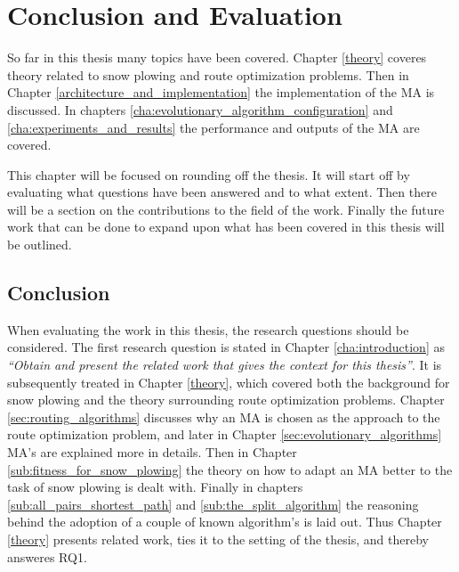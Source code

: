 \chapter{Conclusion and Evaluation}

So far in this thesis many topics have been covered. Chapter \ref{theory} coveres theory related to snow plowing and route optimization problems. Then in Chapter \ref{architecture_and_implementation} the implementation of the MA is discussed. In chapters \ref{cha:evolutionary_algorithm_configuration} and \ref{cha:experiments_and_results} the performance and outputs of the MA are covered.

This chapter will be focused on rounding off the thesis. It will start off by evaluating what questions have been answered and to what extent. Then there will be a section on the contributions to the field of the work. Finally the future work that can be done to expand upon what has been covered in this thesis will be outlined.

\section{Conclusion}

When evaluating the work in this thesis, the research questions should be considered. The first research question is stated in Chapter \ref{cha:introduction} as \emph{\enquote{Obtain and present the related work that gives the context for this thesis}}. It is subsequently treated in Chapter \ref{theory}, which covered both the background for snow plowing and the theory surrounding route optimization problems. Chapter \ref{sec:routing_algorithms} discusses why an MA is chosen as the approach to the route optimization problem, and later in Chapter \ref{sec:evolutionary_algorithms} MA's are explained more in details. Then in Chapter \ref{sub:fitness_for_snow_plowing} the theory on how to adapt an MA better to the task of snow plowing is dealt with. Finally in chapters \ref{sub:all_pairs_shortest_path} and \ref{sub:the_split_algorithm} the reasoning behind the adoption of a couple of known algorithm's is laid out. Thus Chapter \ref{theory} presents related work, ties it to the setting of the thesis, and thereby answeres RQ1.


